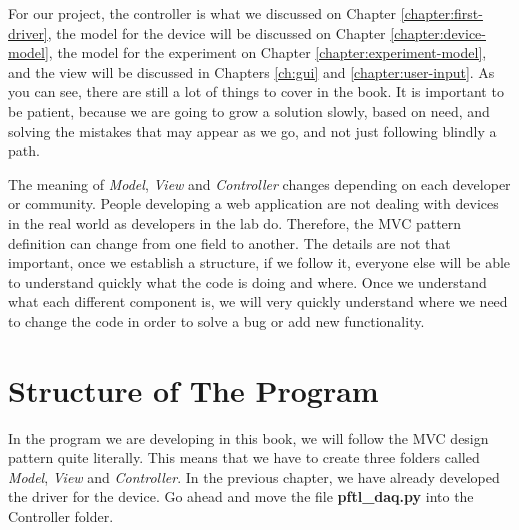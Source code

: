 For our project, the controller is what we discussed on Chapter \ref{chapter:first-driver}, the model for the device will be discussed on Chapter \ref{chapter:device-model}, the model for the experiment on Chapter \ref{chapter:experiment-model}, and the view will be discussed in Chapters \ref{ch:gui} and \ref{chapter:user-input}. As you can see, there are still a lot of things to cover in the book. It is important to be patient, because we are going to grow a solution slowly, based on need, and solving the mistakes that may appear as we go, and not just following blindly a path.


The meaning of \emph{Model}, \emph{View} and \emph{Controller} changes depending on each developer or community. People developing a web application are not dealing with devices in the real world as developers in the lab do. Therefore, the {MVC} pattern definition can change from one field to another. The details are not that important, once we establish a structure, if we follow it, everyone else will be able to understand quickly what the code is doing and where. Once we understand what each different component is, we will very quickly understand where we need to change the code in order to solve a bug or add new functionality.

\section{Structure of The Program}\label{section:structure-of-theprogram}
In the program we are developing in this book, we will follow the MVC design pattern quite literally. This means that we have to create three folders called \emph{Model}, \emph{View} and \emph{Controller}. In the previous chapter, we have already developed the driver for the device. Go ahead and move the file \textbf{pftl\_daq.py} into the Controller folder.

